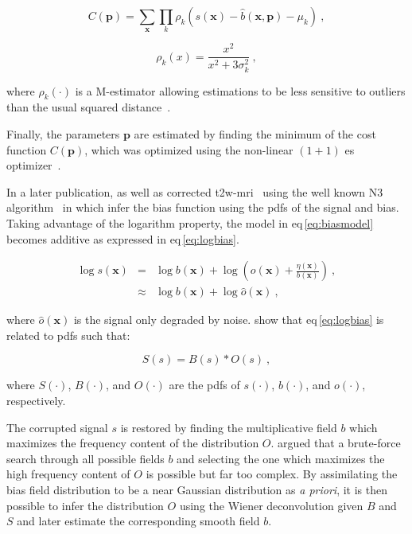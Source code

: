 \begin{equation}
	C(\mathbf{p}) = \sum_{\mathbf{x}} \prod_{k} \rho_k(s(\mathbf{x}) - \hat{b}(\mathbf{x},\mathbf{p}) - \mu_k) \ ,
	\label{eq:costbias}
\end{equation}

\begin{equation}
	\rho_k(x) = \frac{x^2}{x^2 + 3 \sigma_k^2} \ ,
	\label{eq:mestbias}
\end{equation}

\noindent where $\rho_k(\cdot)$ is a M-estimator allowing estimations to be less sensitive to outliers than the usual squared distance~\cite{Li1996}.

Finally, the parameters $\mathbf{p}$ are estimated by finding the minimum of the cost function $C(\mathbf{p})$, which was optimized using the non-linear $(1+1)$ \ac{es} optimizer~\cite{Styner1997}.

In a later publication, \citeauthor{Viswanath2012} as well as \citeauthor{giannini2015fully} corrected \ac{t2w}-\ac{mri}~\cite{Viswanath2012,giannini2015fully} using the well known N3 algorithm~\cite{Sled1998} in which \citeauthor{Sled1998} infer the bias function using the \acp{pdf} of the signal and bias.
Taking advantage of the logarithm property, the model in \acs{eq}\,\eqref{eq:biasmodel} becomes additive as expressed in \acs{eq}\,\eqref{eq:logbias}.

\begin{eqnarray}
	\log s(\mathbf{x}) & = & \log b(\mathbf{x}) + \log \left( o(\mathbf{x}) + \frac{\eta(\mathbf{x})}{b(\mathbf{x})} \right) \ , \nonumber \\
	& \approx & \log b(\mathbf{x}) + \log \hat{o}(\mathbf{x}) \ , \label{eq:logbias}
\end{eqnarray}

\noindent where $\hat{o}(\mathbf{x})$ is the signal only degraded by noise. \citeauthor{Sled1998} show that \acs{eq}\,\eqref{eq:logbias} is related to \acp{pdf} such that:

\begin{equation}
	S(s) = B(s) * O(s) \ ,
	\label{eq:distrbias} 
\end{equation}

\noindent where $S(\cdot)$, $B(\cdot)$, and $O(\cdot)$ are the \acp{pdf} of $s(\cdot)$, $b(\cdot)$, and $o(\cdot)$, respectively.

The corrupted signal $s$ is restored by finding the multiplicative field $b$ which maximizes the frequency content of the distribution $O$.
\citeauthor{Sled1998} argued that a brute-force search through all possible fields $b$ and selecting the one which maximizes the high frequency content of $O$ is possible but far too complex.
By assimilating the bias field distribution to be a near Gaussian distribution as \textit{a priori}, it is then possible to infer the distribution $O$ using the Wiener deconvolution given $B$ and $S$ and later estimate the corresponding smooth field $b$.

